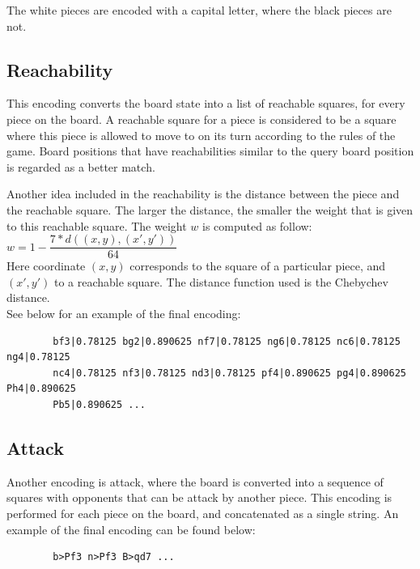 \documentclass[11pt]{article}
\begin{document}
    The white pieces are encoded with a capital letter, where the black pieces are not.

    \subsection{Reachability}

    This encoding converts the board state into a list of reachable squares, for every piece on the board. A reachable square for a piece is considered to be a square where this piece is allowed to move to on its turn according to the rules of the game. Board positions that have reachabilities similar to the query board position is regarded as a better match.

    Another idea included in the reachability is the distance between the piece and the reachable square. The larger the distance, the smaller the weight that is given to this reachable square.
    The weight $w$ is computed as follow:\\

    $w = 1 - \dfrac{7 * d((x,y),(x',y'))}{64}$ \\

    Here coordinate $(x,y)$ corresponds to the square of a particular piece, and $(x',y')$ to a reachable square. The distance function used is the Chebychev distance.\\
    See below for an example of the final encoding:

    \begin{verbatim}
        bf3|0.78125 bg2|0.890625 nf7|0.78125 ng6|0.78125 nc6|0.78125 ng4|0.78125
        nc4|0.78125 nf3|0.78125 nd3|0.78125 pf4|0.890625 pg4|0.890625 Ph4|0.890625
        Pb5|0.890625 ...
    \end{verbatim}

    \subsection{Attack}

    Another encoding is attack, where the board is converted into a sequence of squares with opponents that can be attack by another piece. This encoding is performed for each piece on the board, and concatenated as a single string. An example of the final encoding can be found below:

    \begin{verbatim}
        b>Pf3 n>Pf3 B>qd7 ...
    \end{verbatim}
\end{document}
